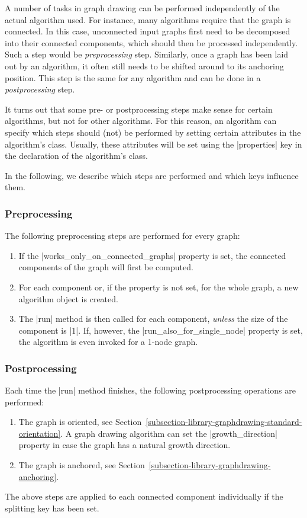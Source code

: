 A number of tasks in graph drawing can be performed independently of
the actual algorithm used. For instance, many algorithms require that
the graph is connected. In this case, unconnected input graphs first
need to be decomposed into their connected components, which should
then be processed independently. Such a step would be
\emph{preprocessing} step. Similarly, once a graph has been laid out
by an algorithm, it often still needs to be shifted around to its
anchoring position. This step is the same for any algorithm and can be
done in a \emph{postprocessing} step.

It turns out that some pre- or postprocessing steps make sense for
certain algorithms, but not for other algorithms. For this reason, an
algorithm can specify which steps should (not) be performed by setting
certain attributes in the algorithm's class. Usually, these attributes
will be set using the |properties| key in the declaration of the
algorithm's class.

In the following, we describe which steps are performed and which keys
influence them.


\subsubsection{Preprocessing}

The following preprocessing steps are performed for every graph:
\begin{enumerate}
\item If the |works_only_on_connected_graphs| property is set, the
  connected components of the graph will first be computed.
\item For each component or, if the property is not set, for the whole
  graph, a new algorithm object is created.
\item The |run| method is then called for each component,
  \emph{unless} the size of the component is |1|. If, however, the
  |run_also_for_single_node| property is set, the algorithm is even
  invoked for a 1-node graph.
\end{enumerate}

\subsubsection{Postprocessing}

Each time the |run| method finishes, the following postprocessing
operations are performed:
\begin{enumerate}
\item The graph is oriented, see
  Section~\ref{subsection-library-graphdrawing-standard-orientation}. A
  graph drawing algorithm can set the |growth_direction| property in
  case the graph has a natural growth direction.
\item The graph is anchored, see
  Section~\ref{subsection-library-graphdrawing-anchoring}. 
\end{enumerate}
The above steps are applied to each connected component individually
if the splitting key has been set.

